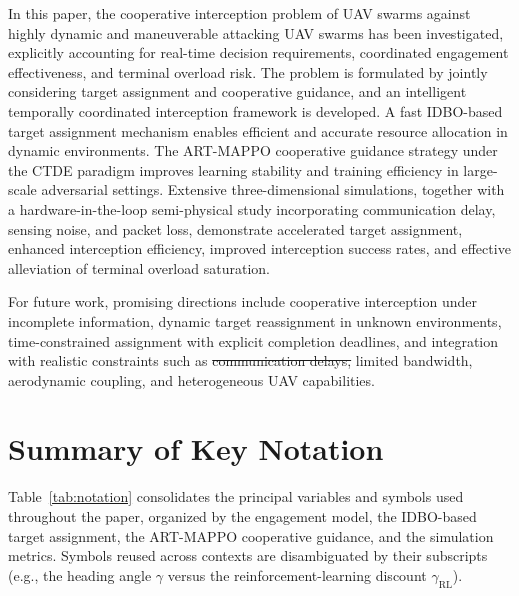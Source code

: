 \documentclass[lettersize,journal]{IEEEtran}
\newcommand{\hladd}[1]{{\color{blue}#1}}
\newcommand{\hldel}[1]{{\color{red}\sout{#1}}}
\begin{document}
In this paper, the cooperative interception problem of UAV swarms against highly dynamic and
maneuverable attacking UAV swarms has been investigated, explicitly accounting for real-time
decision requirements, coordinated engagement effectiveness, and terminal overload risk.
The problem is formulated by jointly considering target assignment and cooperative guidance,
and an intelligent temporally coordinated interception framework is developed.
A fast IDBO-based target assignment mechanism enables efficient and accurate resource
allocation in dynamic environments.
The ART-MAPPO cooperative guidance strategy under the CTDE paradigm improves learning
stability and training efficiency in large-scale adversarial settings.
Extensive \hladd{three-dimensional} simulations\hladd{, together with a hardware-in-the-loop
semi-physical study incorporating communication delay, sensing noise, and packet loss,}
demonstrate accelerated target assignment, enhanced interception efficiency, improved
interception success rates, and effective alleviation of terminal overload saturation.

For future work, promising directions include cooperative interception under incomplete
information, dynamic target reassignment in unknown environments, time-constrained assignment
with explicit completion deadlines, and integration with realistic constraints such as
\hldel{communication delays,} limited bandwidth, \hladd{aerodynamic coupling,} and heterogeneous UAV capabilities.










\appendices
\section{\hladd{Summary of Key Notation}}
\label{app:notation}

\hladd{Table~\ref{tab:notation} consolidates the principal variables and symbols used throughout the paper, organized by the engagement model, the IDBO-based target assignment, the ART-MAPPO cooperative guidance, and the simulation metrics. Symbols reused across contexts are disambiguated by their subscripts (e.g., the heading angle $\gamma$ versus the reinforcement-learning discount $\gamma_{\mathrm{RL}}$).}
\end{document}
